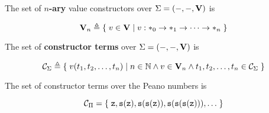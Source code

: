 \begin{definition} The set of \textbf{$n$-ary} value constructors over $\Sigma
= \p{-, -, \mathbf{V}}$ is

$$\mathbf{V}_n \triangleq \set{v \in \mathbf{V} \st{v : *_0 \rightarrow *_1
\rightarrow \cdots \rightarrow *_n}}$$

\end{definition}

\begin{definition} The set of \textbf{constructor terms} over
$\Sigma=\p{-, -, \mathbf{V}}$ is

$$\mathcal{C}_\Sigma \triangleq \set{v\p{t_1,t_2,\ldots,t_n} \st{n \in
\mathbb{N} \wedge v \in \mathbf{V}_n \wedge t_1,t_2,\ldots,t_n \in
\mathcal{C}_\Sigma}}$$

\end{definition}

\begin{example} The set of constructor terms over the Peano numbers is

$$\mathcal{C}_\Pi = \set{\mathtt{z}, \mathtt{s}\p{\mathtt{z}},
\mathtt{s}\p{\mathtt{s}\p{\mathtt{z}}},
\mathtt{s}\p{\mathtt{s}\p{\mathtt{s}\p{\mathtt{z}}}}, \ldots}$$

\end{example}








